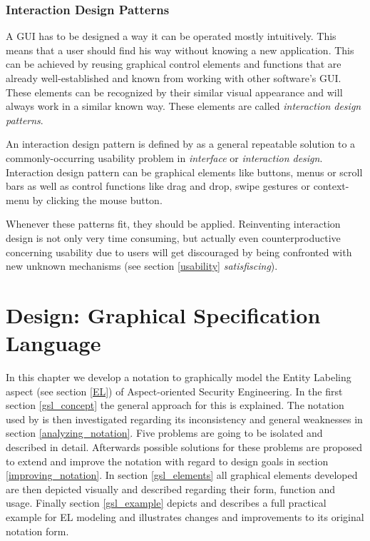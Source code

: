 \documentclass[twoside, openright, 12pt]{book}
\begin{document}
\subsection{Interaction Design Patterns}
\label{design_patterns}
A GUI has to be designed a way it can be operated mostly intuitively.
This means that a user should find his way without knowing a new application.
This can be achieved by reusing graphical control elements and functions that are already well-established and known from working with other software's GUI.
These elements can be recognized by their similar visual appearance and will always work in a similar known way.
These elements are called \textit{interaction design patterns}.

An interaction design pattern is defined by \cite{Folmer} as a general repeatable solution to a commonly-occurring usability problem in \textit{interface} or \textit{interaction design}.
Interaction design pattern can be graphical elements like buttons, menus or scroll bars as well as control functions like drag and drop, swipe gestures or context-menu by clicking the mouse button.

Whenever these patterns fit, they should be applied.
Reinventing interaction design is not only very time consuming, but actually even counterproductive concerning usability due to users will get discouraged by being confronted with new unknown mechanisms (see section \ref{usability} \textit{satisfiscing}).





\cleardoublepage
\chapter{Design: Graphical Specification Language}
\label{gsl}
In this chapter we develop a notation to graphically model the Entity Labeling aspect (see section \ref{EL}) of Aspect-oriented Security Engineering.
In the first section \ref{gsl_concept} the general approach for this is explained.
The notation used by \cite{Amthor18} is then investigated regarding its inconsistency and general weaknesses in section \ref{analyzing_notation}.
Five problems are going to be isolated and described in detail.
Afterwards possible solutions for these problems are proposed to extend and improve the notation with regard to design goals in section \ref{improving_notation}.
In section \ref{gsl_elements} all graphical elements developed are then depicted visually and described regarding their form, function and usage.
Finally section \ref{gsl_example} depicts and describes a full practical example for EL modeling and illustrates changes and improvements to its original notation form.
\end{document}
